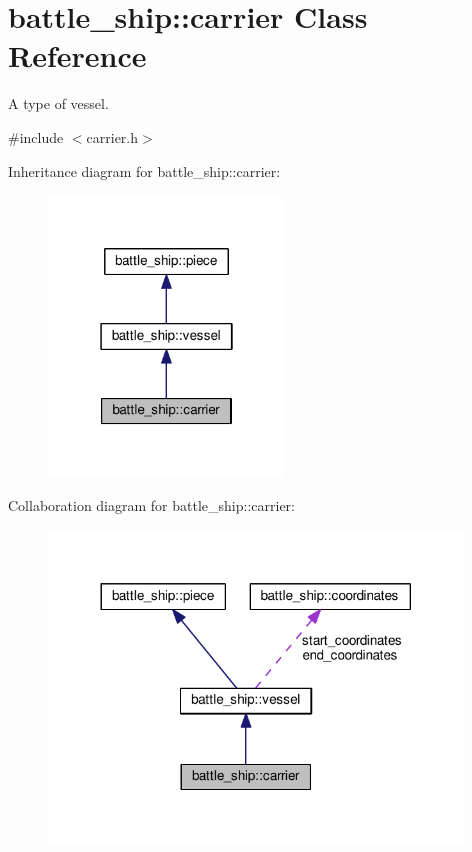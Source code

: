 \hypertarget{classbattle__ship_1_1carrier}{}\section{battle\+\_\+ship\+:\+:carrier Class Reference}
\label{classbattle__ship_1_1carrier}


A type of vessel.  




{\ttfamily \#include $<$carrier.\+h$>$}



Inheritance diagram for battle\+\_\+ship\+:\+:carrier\+:
\nopagebreak
\begin{figure}[H]
\begin{center}
\leavevmode
\includegraphics[width=178pt]{classbattle__ship_1_1carrier__inherit__graph}
\end{center}
\end{figure}


Collaboration diagram for battle\+\_\+ship\+:\+:carrier\+:
\nopagebreak
\begin{figure}[H]
\begin{center}
\leavevmode
\includegraphics[width=312pt]{classbattle__ship_1_1carrier__coll__graph}
\end{center}
\end{figure}
